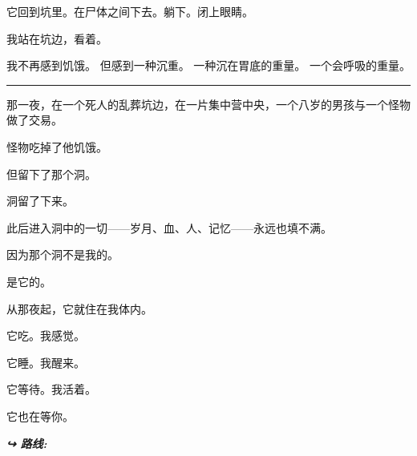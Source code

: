 \noindent 它回到坑里。在尸体之间下去。躺下。闭上眼睛。

\noindent 我站在坑边，看着。

\noindent 我不再感到饥饿。
但感到一种沉重。
一种沉在胃底的重量。
一个会呼吸的重量。

\vspace{0.5em}\noindent\rule{\textwidth}{0.5pt}\vspace{0.5em}

\noindent 那一夜，在一个死人的乱葬坑边，在一片集中营中央，一个八岁的男孩与一个怪物做了交易。

\noindent 怪物吃掉了他饥饿。

\noindent 但留下了那个洞。

\noindent 洞留了下来。

\noindent 此后进入洞中的一切——岁月、血、人、记忆——永远也填不满。

\noindent 因为那个洞不是我的。

\noindent 是它的。

\noindent 从那夜起，它就住在我体内。

\noindent 它吃。我感觉。

\noindent 它睡。我醒来。

\noindent 它等待。我活着。

\noindent 它也在等你。

\vspace{0.5em}
\noindent\textit{\textbf{↪ 路线:}  \rotasep {} \rotasep {}}
